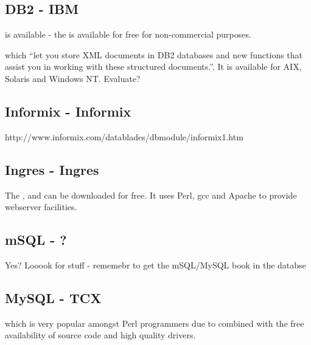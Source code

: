 \subsection{DB2 - IBM}
\label{sec:db2}

is available - the  is available
for free for non-commercial purposes.  

 which ``let you store XML documents in DB2 databases
and new functions that assist you in working with these structured
documents.''.  It is available for AIX, Solaris and Windows NT.
  \textsf{Evaluate?} 

  

\subsection{Informix - Informix}
\label{sec:informix}

http://www.informix.com/datablades/dbmodule/informix1.htm

 
\subsection{Ingres - Ingres}
\label{sec:ingres}

The
, and can be downloaded for
free.  It uses Perl, gcc and Apache to provide webserver facilities.


\subsection{mSQL - ?}
\label{sec:msql}

\textsf{Yes?  Looook for stuff - rememebr to get the mSQL/MySQL book
  in the databse}

\subsection{MySQL - TCX}
\label{sec:mysql}

 which is
very popular amongst Perl programmers due to
combined with the free availability of source code and high quality
drivers.

